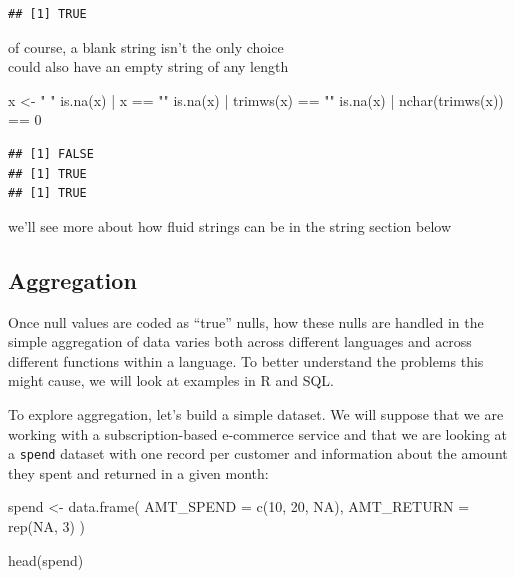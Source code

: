 \documentclass[
]{krantz}
\makeatletter
\newenvironment{Shaded}{\begin{snugshade}}{\end{snugshade}}
\newcommand{\AttributeTok}[1]{\textcolor[rgb]{0.61,0.61,0.61}{#1}}
\newcommand{\ConstantTok}[1]{\textcolor[rgb]{0,0,0}{#1}}
\newcommand{\DecValTok}[1]{\textcolor[rgb]{0.06,0.06,0.06}{#1}}
\newcommand{\FunctionTok}[1]{\textcolor[rgb]{0,0,0}{#1}}
\newcommand{\NormalTok}[1]{#1}
\newcommand{\OtherTok}[1]{\textcolor[rgb]{0.37,0.37,0.37}{#1}}
\newcommand{\SpecialCharTok}[1]{\textcolor[rgb]{0,0,0}{#1}}
\newcommand{\StringTok}[1]{\textcolor[rgb]{0.5,0.5,0.5}{#1}}
\newenvironment{kframe}{%
\medskip{}
\setlength{\fboxsep}{.8em}
 \def\at@end@of@kframe{}%
 \ifinner\ifhmode%
  \def\at@end@of@kframe{\end{minipage}}%
  \begin{minipage}{\columnwidth}%
 \fi\fi%
 \def\FrameCommand##1{\hskip\@totalleftmargin \hskip-\fboxsep
 \colorbox{shadecolor}{##1}\hskip-\fboxsep
     \hskip-\linewidth \hskip-\@totalleftmargin \hskip\columnwidth}%
 \MakeFramed {\advance\hsize-\width
   \@totalleftmargin\z@ \linewidth\hsize
   \@setminipage}}%
 {\par\unskip\endMakeFramed%
 \at@end@of@kframe}
\renewenvironment{Shaded}{\begin{kframe}}{\end{kframe}}
\makeatother
\begin{document}
\begin{verbatim}
## [1] TRUE
\end{verbatim}

of course, a blank string isn't the only choice\\
could also have an empty string of any length

\begin{Shaded}
\begin{Highlighting}[]
\NormalTok{x }\OtherTok{\textless{}{-}} \StringTok{"  "}
\FunctionTok{is.na}\NormalTok{(x) }\SpecialCharTok{|}\NormalTok{ x }\SpecialCharTok{==} \StringTok{""}
\FunctionTok{is.na}\NormalTok{(x) }\SpecialCharTok{|} \FunctionTok{trimws}\NormalTok{(x) }\SpecialCharTok{==} \StringTok{""}
\FunctionTok{is.na}\NormalTok{(x) }\SpecialCharTok{|} \FunctionTok{nchar}\NormalTok{(}\FunctionTok{trimws}\NormalTok{(x)) }\SpecialCharTok{==} \DecValTok{0}
\end{Highlighting}
\end{Shaded}

\begin{verbatim}
## [1] FALSE
## [1] TRUE
## [1] TRUE
\end{verbatim}

we'll see more about how fluid strings can be in the string section below

\hypertarget{aggregation}{%
\subsection{Aggregation}\label{aggregation}}

Once null values are coded as ``true'' nulls, how these nulls are handled in the simple aggregation of data varies both across different languages and across different functions within a language.
To better understand the problems this might cause, we will look at examples in R and SQL.

To explore aggregation, let's build a simple dataset. We will suppose that we are working with a subscription-based e-commerce service and that we are looking at a \texttt{spend} dataset with one record per customer and information about the amount they spent and returned in a given month:

\begin{Shaded}
\begin{Highlighting}[]
\NormalTok{spend }\OtherTok{\textless{}{-}}
  \FunctionTok{data.frame}\NormalTok{(}
    \AttributeTok{AMT\_SPEND =} \FunctionTok{c}\NormalTok{(}\DecValTok{10}\NormalTok{, }\DecValTok{20}\NormalTok{, }\ConstantTok{NA}\NormalTok{),}
    \AttributeTok{AMT\_RETURN =} \FunctionTok{rep}\NormalTok{(}\ConstantTok{NA}\NormalTok{, }\DecValTok{3}\NormalTok{)}
\NormalTok{  )}

\FunctionTok{head}\NormalTok{(spend)}
\end{Highlighting}
\end{Shaded}
\end{document}
